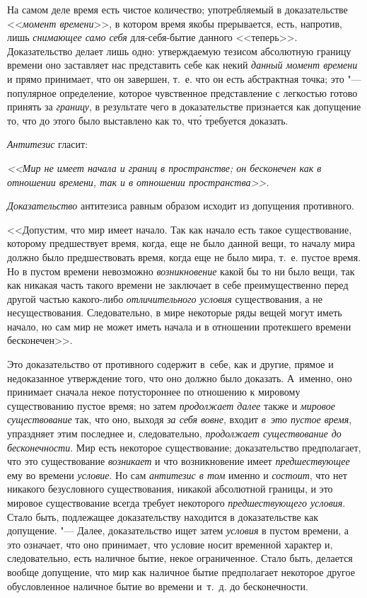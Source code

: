 На самом деле время есть чистое количество; употребляемый в доказательстве
<<{\em момент времени}>>, в котором время якобы прерывается, есть, напротив,
лишь {\em снимающее само себя} для-себя-бытие данного <<теперь>>.
Доказательство делает лишь одно: утверждаемую тезисом абсолютную границу
времени оно заставляет нас представить себе как некий
{\em данный момент времени} и прямо принимает, что он завершен, т.~е. что он
есть абстрактная точка; это "--- популярное определение, которое чувственное
представление с легкостью готово принять за {\em границу}, в результате чего
в доказательстве признается как допущение то, что до этого было выставлено как
то, чт\'{о} требуется доказать.

{\em Антитезис} гласит:

{\em <<Мир не имеет начала и границ в пространстве; он бесконечен
как в отношении времени, так и в отношении пространства>>.}

{\em Доказательство} антитезиса равным образом исходит из допущения противного.

<<Допустим, что мир имеет начало. Так как начало есть такое существование,
которому предшествует время, когда, еще не было данной вещи, то началу мира
должно было предшествовать время, когда еще не было мира, т.~е. пустое время.
Но в пустом времени невозможно {\em возникновение} какой бы то ни было вещи,
так как никакая часть такого времени не заключает в себе преимущественно перед
другой частью какого-либо {\em отличительного условия} существования, а не
несуществования. Следовательно, в мире некоторые ряды вещей могут иметь начало,
но сам мир не может иметь начала и в отношении протекшего времени бесконечен>>.

Это доказательство от противного содержит в~себе, как и другие, прямое и
недоказанное утверждение того, что оно должно было доказать. А~именно, оно
принимает сначала некое потустороннее по отношению к мировому существованию
пустое время; но затем {\em продолжает далее} также и {\em мировое
существование} так, что оно, выходя {\em за себя вовне}, входит
{\em в~это пустое время}, упраздняет этим последнее и, следовательно,
{\em продолжает существование до бесконечности}. Мир есть некоторое
существование; доказательство предполагает, что это существование
{\em возникает} и что возникновение имеет {\em предшествующее} ему во времени
{\em условие}. Но сам {\em антитезис в том} именно и {\em состоит}, что нет
никакого безусловного существования, никакой абсолютной границы, и это мировое
существование всегда требует некоторого {\em предшествующего условия}. Стало
быть, подлежащее доказательству находится в доказательстве как
допущение. "--- Далее, доказательство ищет затем {\em условия} в пустом
времени, а это означает, что оно принимает, что условие носит временной
характер и, следовательно, есть наличное бытие, некое ограниченное. Стало быть,
делается вообще допущение, что мир как наличное бытие предполагает некоторое
другое обусловленное наличное бытие во времени и~т.~д. до бесконечности.

